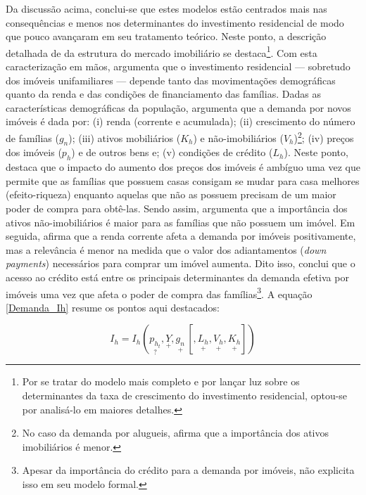 Da discussão acima, 
conclui-se que estes modelos estão centrados mais nas consequências e menos nos determinantes do investimento residencial de modo que pouco avançaram em seu tratamento teórico.
Neste ponto, a descrição detalhada de \textcite{duesenberry_investment_1958} da estrutura do mercado imobiliário se destaca\footnote{
	Por se tratar do modelo mais completo e por lançar luz sobre os determinantes da taxa de crescimento do investimento residencial, optou-se por analisá-lo em maiores detalhes.
}.
Com esta caracterização em mãos, argumenta que o investimento residencial --- sobretudo dos imóveis unifamiliares --- depende tanto das movimentações demográficas quanto da renda e das condições de financiamento das famílias.
Dadas as características demográficas da população, argumenta que a demanda por novos imóveis é dada por:
	(i) renda (corrente e acumulada);
	(ii) crescimento do número de famílias ($g_n$);
	(iii) ativos mobiliários ($K_h$) e não-imobiliários ($V_h$)\footnote{No caso da demanda por alugueis, \textcite{duesenberry_investment_1958} afirma que a importância dos ativos imobiliários é menor.};
	(iv) preços dos imóveis ($p_h$) e de outros bens e;
	(v) condições de crédito ($L_h$).
Neste ponto, \textcite{duesenberry_investment_1958} destaca que o impacto do aumento dos preços dos imóveis é ambíguo uma vez que permite que as famílias que possuem casas consigam se mudar para casa melhores (efeito-riqueza) enquanto aquelas que não as possuem  precisam de um maior poder de compra para obtê-las.
Sendo assim, argumenta que a importância dos ativos não-imobiliários é maior para as famílias que não possuem um imóvel.
Em seguida, afirma que a renda corrente afeta a demanda por imóveis positivamente, mas a relevância é menor na medida que o valor dos adiantamentos (\textit{down payments}) necessários para comprar um imóvel aumenta.
Dito isso, conclui que o acesso ao crédito está entre os principais determinantes da demanda efetiva por imóveis uma vez que afeta o poder de compra das famílias\footnote{
Apesar da importância do crédito para a demanda por imóveis, \textcite{duesenberry_investment_1958} não explicita isso em seu modelo formal.
}.
A equação \ref{Demanda_Ih} resume os pontos aqui destacados:

\begin{equation}
\label{Demanda_Ih}
I_{h} = I_h(\underset{?}{p_{h_t}}, \underset{+}{Y}, \underset{+}{g_n}\, [, \underset{+}{L_h}, \underset{+}{V_h}, \underset{+}{K_h}])
\end{equation}

